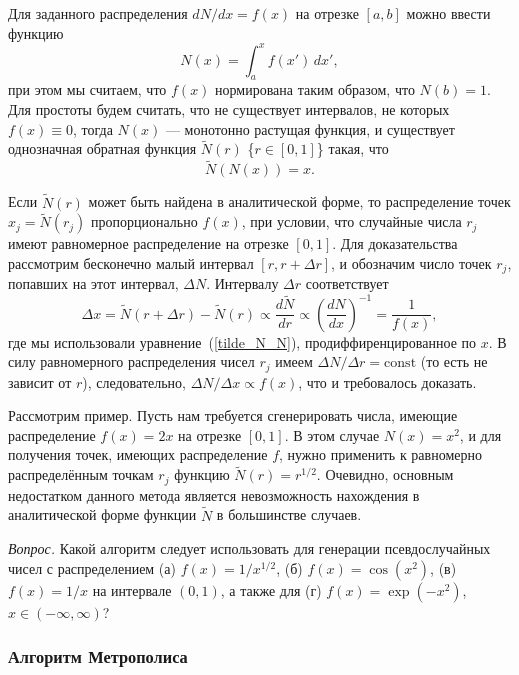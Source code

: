 \documentclass{book}
\begin{document}
Для заданного распределения $dN/dx = f(x)$ на отрезке $[a, b]$ можно ввести функцию
\begin{equation}
    N(x) = \int_a^x f(x') \, dx',
\end{equation}
при этом мы считаем, что $f(x)$ нормирована таким образом, что $N(b) = 1$. Для простоты будем
считать, что не существует интервалов, не которых $f(x) \equiv 0$, тогда $N(x)$ --- монотонно
растущая функция, и существует однозначная обратная функция $\tilde N(r)$ \{$r \in [0, 1]$\}
такая, что
\begin{equation}
    \label{tilde_N_N}
    \tilde N(N(x)) = x.
\end{equation}

Если $\tilde N(r)$ может быть найдена в аналитической форме, то распределение точек $x_j = \tilde
N(r_j)$ пропорционально $f(x)$, при условии, что случайные числа $r_j$ имеют равномерное
распределение на отрезке $[0, 1]$. Для доказательства рассмотрим бесконечно малый интервал $[r, r +
\Delta r]$, и обозначим число точек $r_j$, попавших на этот интервал, $\Delta N$.
Интервалу $\Delta r$ соответствует
\begin{equation}
    \Delta x = \tilde N(r + \Delta r) - \tilde N(r) \propto \frac{d \tilde N}{dr} \propto \left(
    \frac{dN}{dx} \right)^{-1} = \frac{1}{f(x)},
\end{equation}
где мы использовали уравнение~(\ref{tilde_N_N}), продиффиренцированное по $x$.  В силу равномерного
распределения чисел $r_j$ имеем $\Delta N / \Delta r = \mathrm{const}$ (то есть не зависит от $r$),
следовательно, $\Delta N / \Delta x \propto f(x)$, что и требовалось доказать.

Рассмотрим пример. Пусть нам требуется сгенерировать числа, имеющие распределение $f(x) = 2 x$ на
отрезке $[0, 1]$. В этом случае $N(x) = x^2$, и для получения точек, имеющих распределение $f$,
нужно применить к равномерно распределённым точкам $r_j$ функцию $\tilde N(r) = r^{1/2}$. Очевидно,
основным недостатком данного метода является невозможность нахождения в аналитической форме функции
$\tilde N$ в большинстве случаев.

\textit{Вопрос.} Какой алгоритм следует использовать для генерации псевдослучайных чисел с
распределением (а) $f(x) = 1 / x^{1/2}$, (б) $f(x) = \cos (x^2)$, (в) $f(x) = 1 / x$  на интервале
$(0, 1)$, а также для (г) $f(x) = \exp(-x^2)$, $x \in (-\infty, \infty)$?

\subsubsection{Алгоритм Метрополиса}
\end{document}
